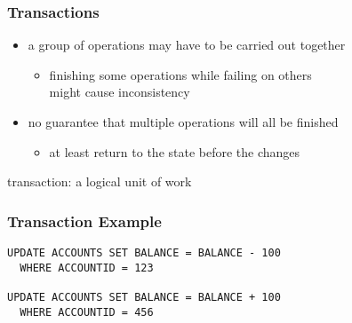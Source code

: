 \documentclass[dvipsnames]{beamer}
\theoremstyle{plain}
\begin{document}
\begin{frame}
  \frametitle{Transactions}

  \begin{itemize}
    \item a group of operations may have to be carried out together
    \begin{itemize}
      \item finishing some operations while failing on others\\
	might cause inconsistency
    \end{itemize}

    \pause
    \item no guarantee that multiple operations will all be finished
    \begin{itemize}
      \item at least return to the state before the changes
    \end{itemize}
  \end{itemize}

  \pause
  \begin{definition}
    \alert{transaction}: a logical unit of work
  \end{definition}
\end{frame}

\begin{frame}[fragile]
  \frametitle{Transaction Example}

  \begin{example}
    \begin{lstlisting}
UPDATE ACCOUNTS SET BALANCE = BALANCE - 100
  WHERE ACCOUNTID = 123

UPDATE ACCOUNTS SET BALANCE = BALANCE + 100
  WHERE ACCOUNTID = 456
    \end{lstlisting}
  \end{example}
\end{frame}
\end{document}
